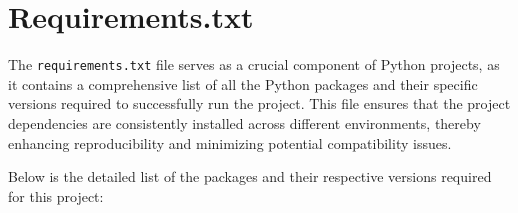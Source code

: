 %
%


\chapter{Requirements.txt}

The \texttt{requirements.txt} file serves as a crucial component of Python projects, as it contains a comprehensive list of all the Python packages and their specific versions required to successfully run the project. This file ensures that the project dependencies are consistently installed across different environments, thereby enhancing reproducibility and minimizing potential compatibility issues.

Below is the detailed list of the packages and their respective versions required for this project:

